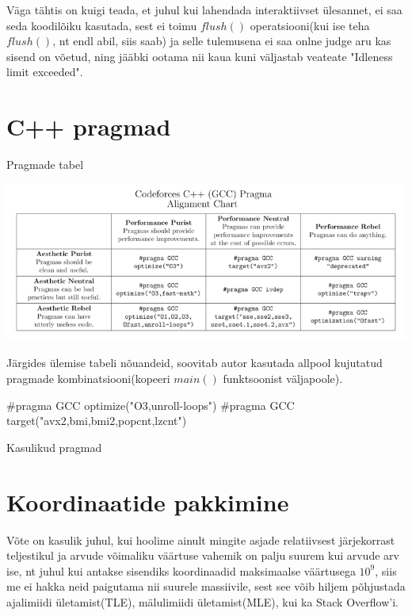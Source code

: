 \documentclass{trkut}
\theoremstyle{definition}
\begin{document}
\begin{appendices}
    \parencite{fast1}
    \parencite{fast2}
    
    Väga tähtis on kuigi teada, et juhul kui lahendada interaktiivset ülesannet, ei saa seda koodilõiku kasutada, sest ei toimu $flush()$ operatsiooni(kui ise teha $flush()$, nt endl abil, siis saab) ja selle tulemusena ei saa onlne judge aru kas sisend on võetud, ning jääbki ootama nii kaua kuni väljastab veateate "Idleness limit exceeded".

    \chapter{C++ pragmad}\label{lisa7}
    \tiny
    \normalsize
    
    \begin{table}[H]%
    \caption{Pragmade tabel}%
    \includegraphics[width=17cm]{pragmatabel.png}%
    \label{pragmas}%
    \end{table}
    
    Järgides ülemise tabeli nõuandeid, soovitab autor kasutada allpool kujutatud pragmade kombinatsiooni(kopeeri $main()$ funktsoonist väljapoole)\parencite{pragmas}.

\begin{cclol}
    #pragma GCC optimize("O3,unroll-loops")
    #pragma GCC target("avx2,bmi,bmi2,popcnt,lzcnt")
\end{cclol}
    \begin{kk}[H]
    \caption{Kasulikud pragmad}%
    \end{kk}



        
   


    \chapter{Koordinaatide pakkimine}\label{lisa8}
    \tiny
    \normalsize
    Võte on kasulik juhul, kui hoolime ainult mingite asjade relatiivsest järjekorrast teljestikul ja arvude võimaliku väärtuse vahemik on palju suurem kui arvude arv ise, nt juhul kui antakse sisendiks koordinaadid maksimaalse väärtusega $10^9$, siis me ei hakka neid paigutama nii suurele massiivile, sest see võib hiljem põhjustada ajalimiidi ületamist(TLE), mälulimiidi ületamist(MLE), kui ka Stack Overflow'i.


\end{appendices}
\end{document}
